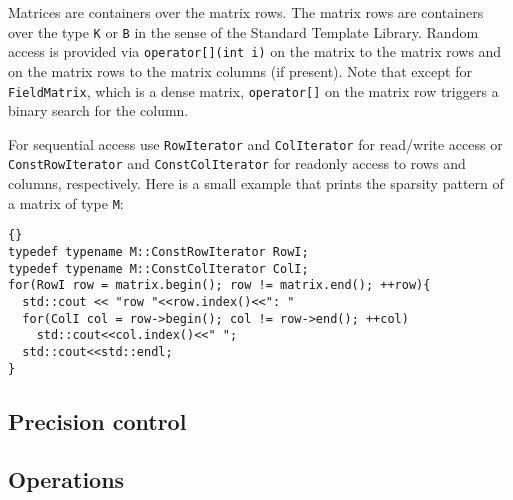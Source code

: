 \documentclass[11pt]{article}
\begin{document}
Matrices are containers over the matrix rows. The matrix rows are
containers over the type  \lstinline!K! or
\lstinline!B! in the sense of the Standard Template Library. Random
access is provided via \lstinline!operator[](int i)! on the matrix to
the matrix rows and on the matrix rows to the matrix columns (if
present). Note that except for \lstinline!FieldMatrix!, which is a
dense matrix,  
\lstinline!operator[]! on the matrix row triggers a binary search for
the column.

For sequential access use 
\lstinline!RowIterator! and \lstinline!ColIterator! for read/write
access or  
\lstinline!ConstRowIterator! and \lstinline!ConstColIterator! for
readonly access to rows and columns, respectively. Here is a small example 
that prints the sparsity pattern of a matrix of type \lstinline!M!:

\begin{lstlisting}{}
typedef typename M::ConstRowIterator RowI;
typedef typename M::ConstColIterator ColI;
for(RowI row = matrix.begin(); row != matrix.end(); ++row){
  std::cout << "row "<<row.index()<<": "
  for(ColI col = row->begin(); col != row->end(); ++col)
    std::cout<<col.index()<<" ";
  std::cout<<std::endl;
}
\end{lstlisting}

\subsection{Precision control}

\subsection{Operations}
\end{document}
